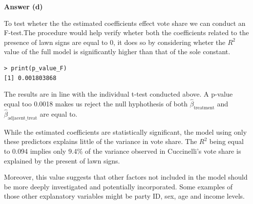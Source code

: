 \documentclass[12pt,letterpaper]{article}
\begin{document}
\vspace{0.5cm}
\noindent\textbf{Answer (d)}\\
\vspace{0.5cm}

\noindent \noindent To test wheter the the estimated coefficients effect vote share we can conduct an F-test.The procedure would help verify wheter both the coefficients related to the presence of lawn signs are equal to 0, it does so by considering wheter the $R^2$ value of the full model is significantly higher than that of the sole constant. 

 
\begin{verbatim}
> print(p_value_F)
[1] 0.001803868
\end{verbatim}

\noindent The results are in line with the individual t-test conducted above. A p-value equal too 0.0018 makes us reject the null hyphothesis of both $\hat{\beta}_{\text{treatment}}$ and $\hat{\beta}_{\text{adjacent\_treat}}$ are equal to. 

\noindent While the estimated coefficients are statistically significant, the model using only these predictors explains little of the variance in vote share. The $R^2$ being equal to 0.094 implies only 9.4\% of the variance observed in Cuccinelli's vote share is explained by the present of lawn signs.

\noindent Moreover, this value suggests that other factors not included in the model should be more deeply investigated and potentially incorporated. Some examples of those other explanatory variables might be party ID, sex, age and income levels.  
\end{document}
